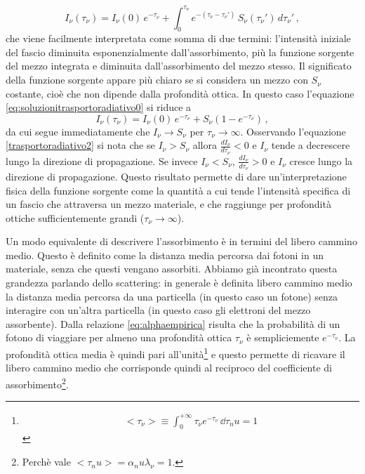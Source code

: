 \begin{equation}
I_{\nu}(\tau_{\nu})=I_{\nu}(0)\,e^{-\tau_{\nu}}+\int_0^{\tau_{\nu}}e^{-(\tau_{\nu}-\tau_{\nu}')}\,S_{\nu}(\tau_{\nu}')\,d\tau_{\nu}'\,, \label{eq:soluzionitrasportoradiativo0}
\end{equation}
che viene facilmente interpretata come somma di due termini: l'intensità iniziale del fascio diminuita esponenzialmente dall'assorbimento, più la funzione sorgente del mezzo integrata e diminuita dall'assorbimento del mezzo stesso. Il significato della funzione sorgente appare più chiaro se si considera un mezzo con $S_{\nu}$ costante, cioè che non dipende dalla profondità ottica. In questo caso l'equazione \ref{eq:soluzionitrasportoradiativo0} si riduce a 
\begin{equation}
I_{\nu}(\tau_{\nu})=I_{\nu}(0)\,e^{-\tau_{\nu}}+S_{\nu}(1-e^{-\tau_{\nu}})\,,
\label{soluzionitrasportoradiativo}
\end{equation}
da cui segue immediatamente che $I_{\nu}{\rightarrow}S_{\nu}$ per $\tau_{\nu}\rightarrow\infty$. Osservando l'equazione \ref{trasportoradiativo2} si nota che se $I_{\nu}>S_{\nu}$ allora $\frac{dI_{\nu}}{d\tau_{\nu}}<0$ e $I_{\nu}$ tende a decrescere lungo la direzione di propagazione. Se invece $I_{\nu}<S_{\nu}$, $\frac{dI_{\nu}}{d\tau_{\nu}}>0$ e $I_{\nu}$ cresce lungo la direzione di propagazione. Questo risultato permette di dare un'interpretazione fisica della funzione sorgente come la quantità a cui tende l'intensità specifica di un fascio che attraversa un mezzo materiale, e che raggiunge per profondità ottiche sufficientemente grandi ($\tau_{\nu}\rightarrow\infty$).

Un modo equivalente di descrivere l'assorbimento è in termini del libero cammino medio. Questo è definito come la distanza media percorsa dai fotoni in un materiale, senza che questi vengano assorbiti. Abbiamo già incontrato questa grandezza parlando dello scattering: in generale è definita libero cammino medio la distanza media percorsa da una particella (in questo caso un fotone) senza interagire con un'altra particella (in questo caso gli elettroni del mezzo assorbente). Dalla relazione \ref{eq:alphaempirica} risulta che la probabilità di un fotono di viaggiare per almeno una profondità ottica $\tau_\nu$ è sempliciemente $e^{-\tau_\nu}$. La profondità ottica media è quindi pari all'unità\footnote{\begin{align*}
<\tau_\nu> \equiv \int_{0}^{+\infty} \tau_\nu e^{-\tau_\nu} \, \dd \tau_nu = 1
\end{align*}}
e questo permette di ricavare il libero cammino medio che corrisponde quindi al reciproco del coefficiente di assorbimento\footnote{Perchè vale $<\tau_nu>=\alpha_nu\lambda_\nu = 1$.}.



